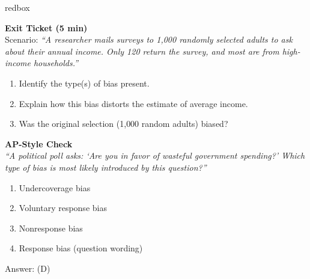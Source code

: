 \documentclass[10pt]{article}
\begin{document}
\begin{skillbox}{redbox}
\begin{minipage}[t]{0.48\linewidth}
    \textbf{Exit Ticket (5 min)}\\
    Scenario: \textit{``A researcher mails surveys to 1{,}000 randomly selected
    adults to ask about their annual income. Only 120 return the survey, and most
    are from high-income households.''}
    \begin{enumerate}
        \item Identify the type(s) of bias present.
        \item Explain how this bias distorts the estimate of average income.
        \item Was the original selection (1{,}000 random adults) biased?
    \end{enumerate}
\end{minipage}
\hfill
\begin{minipage}[t]{0.48\linewidth}
    \textbf{AP-Style Check}\\
    \textit{``A political poll asks: `Are you in favor of wasteful government
    spending?' Which type of bias is most likely introduced by this question?''}
    \begin{enumerate}[label=(\Alph*)]
        \item Undercoverage bias
        \item Voluntary response bias
        \item Nonresponse bias
        \item Response bias (question wording)
    \end{enumerate}
    Answer: (D)
\end{minipage}
\end{skillbox}
\end{document}
